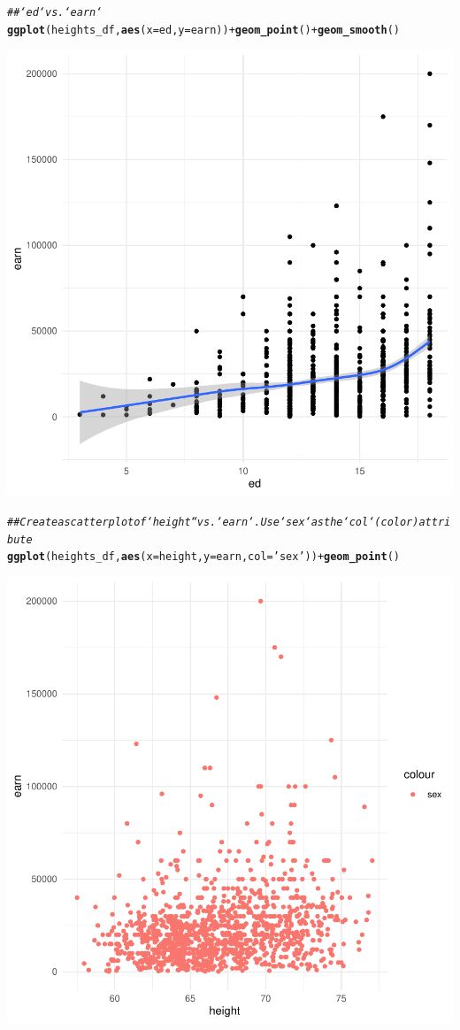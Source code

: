 \documentclass{article}\usepackage[]{graphicx}\usepackage[]{xcolor}
\makeatletter
\newcommand{\hlstr}[1]{\textcolor[rgb]{0.192,0.494,0.8}{#1}}%
\newcommand{\hlcom}[1]{\textcolor[rgb]{0.678,0.584,0.686}{\textit{#1}}}%
\newcommand{\hlopt}[1]{\textcolor[rgb]{0,0,0}{#1}}%
\newcommand{\hlstd}[1]{\textcolor[rgb]{0.345,0.345,0.345}{#1}}%
\newcommand{\hlkwc}[1]{\textcolor[rgb]{0.333,0.667,0.333}{#1}}%
\newcommand{\hlkwd}[1]{\textcolor[rgb]{0.737,0.353,0.396}{\textbf{#1}}}%
\newenvironment{kframe}{%
 \def\at@end@of@kframe{}%
 \ifinner\ifhmode%
  \def\at@end@of@kframe{\end{minipage}}%
  \begin{minipage}{\columnwidth}%
 \fi\fi%
 \def\FrameCommand##1{\hskip\@totalleftmargin \hskip-\fboxsep
 \colorbox{shadecolor}{##1}\hskip-\fboxsep
     \hskip-\linewidth \hskip-\@totalleftmargin \hskip\columnwidth}%
 \MakeFramed {\advance\hsize-\width
   \@totalleftmargin\z@ \linewidth\hsize
   \@setminipage}}%
 {\par\unskip\endMakeFramed%
 \at@end@of@kframe}
\newenvironment{knitrout}{}{} %
\makeatother
\begin{document}
\begin{knitrout}
{}


\begin{kframe}\begin{alltt}
\hlcom{## `ed` vs. `earn`}
\hlkwd{ggplot}\hlstd{(heights_df,} \hlkwd{aes}\hlstd{(}\hlkwc{x}\hlstd{=ed,} \hlkwc{y}\hlstd{=earn))} \hlopt{+} \hlkwd{geom_point}\hlstd{()} \hlopt{+} \hlkwd{geom_smooth}\hlstd{()}
\end{alltt}


{\ttfamily\noindent\itshape{}}\end{kframe}

{\centering \includegraphics[width=.6\linewidth]{figure/assignment-03-TangXin-Rnwauto-report-6} 

}


\begin{kframe}\begin{alltt}
\hlcom{## Create a scatterplot of `height`` vs. `earn`.  Use `sex` as the `col` (color) attribute}
\hlkwd{ggplot}\hlstd{(heights_df,} \hlkwd{aes}\hlstd{(}\hlkwc{x}\hlstd{=height,} \hlkwc{y}\hlstd{=earn,} \hlkwc{col}\hlstd{=}\hlstr{'sex'}\hlstd{))} \hlopt{+} \hlkwd{geom_point}\hlstd{()}
\end{alltt}
\end{kframe}

{\centering \includegraphics[width=.6\linewidth]{figure/assignment-03-TangXin-Rnwauto-report-7} 

}
\end{knitrout}
\end{document}
